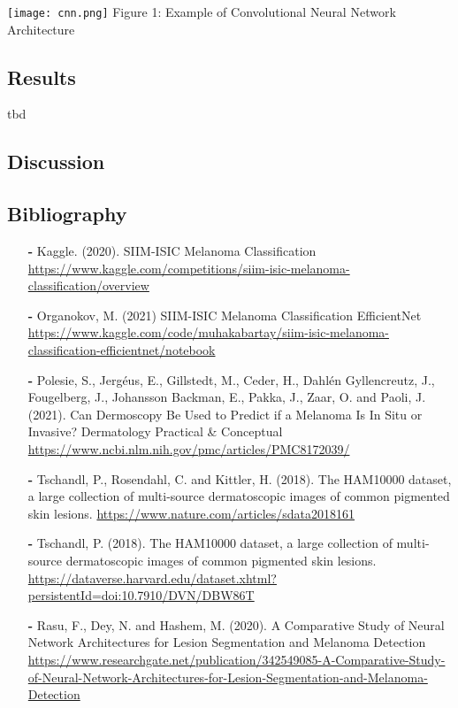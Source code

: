 \documentclass{article}
\begin{document}
\texttt{[image: cnn.png]}
Figure 1: Example of Convolutional Neural Network Architecture
\subsection*{Results}
tbd

\subsection*{Discussion}

\subsection*{Bibliography}


\begin{itemize}
    \item[\textbf{-}] Kaggle. (2020). SIIM-ISIC Melanoma Classification \href{https://www.kaggle.com/competitions/siim-isic-melanoma-classification/overview}{https://www.kaggle.com/competitions/siim-isic-melanoma-classification/overview}
    \item[\textbf{-}]Organokov, M. (2021) SIIM-ISIC Melanoma Classification EfficientNet
    \href{https://www.kaggle.com/code/muhakabartay/siim-isic-melanoma-classification-efficientnet/notebook}{https://www.kaggle.com/code/muhakabartay/siim-isic-melanoma-classification-efficientnet/notebook}
    \item[\textbf{-}]Polesie, S., Jergéus, E., Gillstedt, M., Ceder, H., Dahlén Gyllencreutz, J., Fougelberg, J., Johansson Backman, E., Pakka, J., Zaar, O. and Paoli, J. (2021). Can Dermoscopy Be Used to Predict if a Melanoma Is In Situ or Invasive? Dermatology Practical & Conceptual
    \href{https://www.ncbi.nlm.nih.gov/pmc/articles/PMC8172039/}{https://www.ncbi.nlm.nih.gov/pmc/articles/PMC8172039/}
    \item[\textbf{-}]Tschandl, P., Rosendahl, C. and Kittler, H. (2018). The HAM10000 dataset, a large collection of multi-source dermatoscopic images of common pigmented skin lesions.
    \href{https://www.nature.com/articles/sdata2018161}{https://www.nature.com/articles/sdata2018161}
    \item[\textbf{-}]Tschandl, P. (2018). The HAM10000 dataset, a large collection of multi-source dermatoscopic images of common pigmented skin lesions.
    \href{https://dataverse.harvard.edu/dataset.xhtml?persistentId=doi:10.7910/DVN/DBW86T}{https://dataverse.harvard.edu/dataset.xhtml?persistentId=doi:10.7910/DVN/DBW86T}
    \item[\textbf{-}]Rasu, F., Dey, N. and Hashem, M. (2020). A Comparative Study of Neural Network Architectures for Lesion Segmentation and Melanoma Detection
    \href{https://www.researchgate.net/publication/342549085_A_Comparative_Study_of_Neural_Network_Architectures_for_Lesion_Segmentation_and_Melanoma_Detection}{https://www.researchgate.net/publication/342549085-A-Comparative-Study-of-Neural-Network-Architectures-for-Lesion-Segmentation-and-Melanoma-Detection}
\end{itemize}
\end{document}
